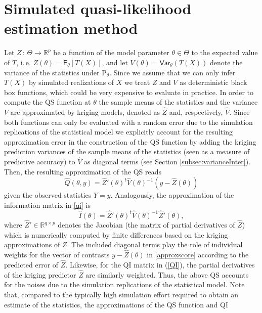 \documentclass[article, nojss]{jss}
\numberwithin{equation}{section}			%
\newcommand{\R}{\mathbb{R}}
\newcommand{\Et}{\mathsf{E}_{\theta}}  %
\newcommand{\var}{\mathsf{Var}_{\theta}} %
\newcommand{\Ptheta}{\mathrm{P}_{\theta}}
\begin{document}
\section{Simulated quasi-likelihood estimation method}\label{sec:SQLE}
%
Let $Z\,:\,\Theta\rightarrow\R^p$ be a function of the model parameter
$\theta\in\Theta$ to the expected value of $T$, i.\,e. $Z(\theta)=\Et[T(X)]$,
and let $V(\theta)=\var(T(X))$ denote the variance of the statistics under
$\Ptheta$. Since we assume that we can only infer $T(X)$ by simulated
realizations of $X$ we treat $Z$ and $V$ as deterministic black box functions,
which could be very expensive to evaluate in practice. In order to compute the
QS function at $\theta$ the sample means of the statistics and the
variance $V$ are approximated by kriging models, denoted as $\hat{Z}$ and,
respectively, $\hat{V}$. Since both functions can only be evaluated with a
random error due to the simulation replications of the statistical model we
explicitly account for the resulting approximation error in the construction of the
QS function by adding the kriging prediction variances of the sample means of
the statistics (seen as a measure of predictive accuracy) to $\hat{V}$ as diagonal terms (see Section
\ref{subsec:varianceInter}). Then, the resulting approximation of the QS reads
\begin{equation}\label{approxscore}
  \hat{Q}(\theta,y)=\hat{Z}'(\theta)^t \hat{V}(\theta)^{-1}(y-\hat{Z}(\theta))
\end{equation}
given the observed statistics $Y=y$. Analogously, the approximation of the
information matrix in \eqref{qi} is
\begin{equation}\label{QI}
 \hat{I}(\theta) = \hat{Z}'(\theta)^t \hat{V}(\theta)^{-1} \hat{Z}'(\theta),
\end{equation}
where $\hat{Z}'\in\R^{q\times p}$ denotes the Jacobian (the matrix of partial
derivatives of $\hat{Z}$) which is numerically computed by finite differences
based on the kriging approximations of $Z$. The included diagonal terms
play the role of individual weights for the vector of contrasts
$y-\hat{Z}(\theta)$ in \eqref{approxscore} according to the predicted error
of $\hat{Z}$. Likewise, for the QI matrix in (\ref{QI}), the partial derivatives
of the kriging predictor $\hat{Z}$ are similarly weighted. Thus, the above QS
accounts for the noises due to the simulation replications of the
statistical model. Note that, compared to the typically high simulation effort
required to obtain an estimate of the statistics, the approximations of the QS function and QI
\end{document}
